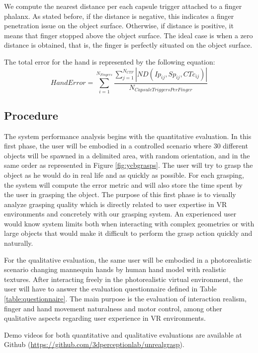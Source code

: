 We compute the nearest distance per each capsule trigger attached to a finger phalanx. As stated before, if the distance is negative, this indicates a finger penetration issue on the object surface. Otherwise, if distance is positive, it means that finger stopped above the object surface. The ideal case is when a zero distance is obtained, that is, the finger is perfectly situated on the object surface.

The total error for the hand is represented by the following equation:
\begin{equation} \label{eq:2}
HandError = \sum_{i=1}^{N_{Fingers}}\frac{\sum_{j=1}^{N_{CTF}}|ND(Ip_{ij},Sp_{ij},CTc_{ij})|}{N_{CapsuleTriggersPerFinger}}
\end{equation}


\subsection{Procedure}

The system performance analysis begins with the quantitative evaluation. In this first phase, the user will be embodied in a controlled scenario where 30 different objects will be spawned in a delimited area, with random orientation, and in the same order as represented in Figure \ref{fig:ycbgrasps}. The user will try to grasp the object as he would do in real life and as quickly as possible. For each grasping, the system will compute the error metric and will also store the time spent by the user in grasping the object. The purpose of this first phase is to visually analyze grasping quality which is directly related to user expertise in VR environments and concretely with our grasping system. An experienced user would know system limits both when interacting with complex geometries or with large objects that would make it difficult to perform the grasp action quickly and naturally.

For the qualitative evaluation, the same user will be embodied in a photorealistic scenario changing mannequin hands by human hand model with realistic textures. After interacting freely in the photorealistic virtual environment, the user will have to answer the evaluation questionnaire defined in Table \ref{table:questionnaire}. The main purpose is the evaluation of interaction realism, finger and hand movement naturalness and motor control, among other qualitative aspects regarding user experience in VR environments. 

Demo videos for both quantitative and qualitative evaluations are available at Github (\url{https://github.com/3dperceptionlab/unrealgrasp}).


